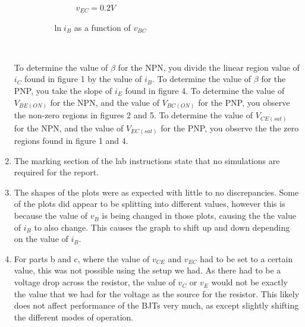 \documentclass[12pt]{article}
\begin{document}
\begin{enumerate}
\begin{enumerate}
\begin{figure}[h!]
\begin{subfigure}[b]{0.48\textwidth}
                \caption{$v_{EC} = 0.2V$}
            \end{subfigure}
            \caption{$\ln i_B$ as a function of $v_{BC}$}
        \end{figure} \\
    \end{enumerate}
    To determine the value of $\beta$ for the NPN, you divide the linear region value of $i_C$ found in figure 1 by the value of $i_B$. To determine the value of $\beta$ for the PNP, you take the slope of $i_E$ found in figure 4. To determine the value of $V_{BE(ON)}$ for the NPN, and the value of $V_{BC(ON)}$ for the PNP, you observe the non-zero regions in figures 2 and 5. To determine the value of $V_{CE(sat)}$ for the NPN, and the value of $V_{EC(sat)}$ for the PNP, you observe the the zero regions found in figure 1 and 4.
    \item The marking section of the lab instructions state that no simulations are required for the report.
    \item The shapes of the plots were as expected with little to no discrepancies. Some of the plots did appear to be splitting into different values, however this is because the value of $v_B$ is being changed in those plots, causing the the value of $i_B$ to also change. This causes the graph to shift up and down depending on the value of $i_B$.
    \item For parts b and c, where the value of $v_{CE}$ and $v_{EC}$ had to be set to a certain value, this was not possible using the setup we had. As there had to be a voltage drop across the resistor, the value of $v_C$ or $v_E$ would not be exactly the value that we had for the voltage as the source for the resistor. This likely does not affect performance of the BJTs very much, as except slightly shifting the different modes of operation.
    \end{enumerate}
\end{document}
